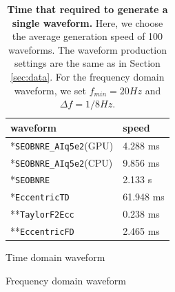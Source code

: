 \documentclass[
reprint,
superscriptaddress,
amsmath,amssymb,
aps,
prd,
floatfix,
]{revtex4-2}
\begin{document}
\begin{table}
\caption{\textbf{Time that required to generate a single waveform.} Here, we choose the average generation speed of 100 waveforms. The waveform production settings are the same as in Section \ref{sec:data}. For the frequency domain waveform, we set $f_{min} = 20Hz$ and $\Delta f = 1/8Hz$.}
\label{tab:2}
\centering
\begin{threeparttable}
    \begin{tabular}{p{3.5cm}<{\centering}p{3.5cm}<{\centering}}
        \toprule
        waveform    & speed  \\
        \midrule
        *\texttt{SEOBNRE\_AIq5e2}(GPU) & 4.288 ms  \\
        *\texttt{SEOBNRE\_AIq5e2}(CPU) & 9.856 ms  \\
        *\texttt{SEOBNRE}        &  2.133 s  \\
        *\texttt{EccentricTD}    & 61.948 ms  \\
        **\texttt{TaylorF2Ecc}    & 0.238 ms  \\
        **\texttt{EccentricFD}    & 2.465 ms  \\
        \bottomrule
    \end{tabular}
    \begin{tablenotes}
\item[*] Time domain waveform
\item[**] Frequency domain waveform
\end{tablenotes}
\end{threeparttable}
\end{table}
\end{document}
